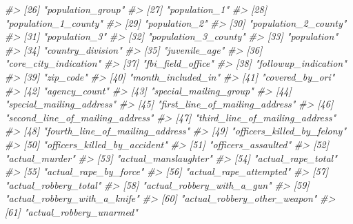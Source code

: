 \documentclass[
]{krantz}
\makeatletter
\newenvironment{Shaded}{\begin{snugshade}}{\end{snugshade}}
\newcommand{\CommentTok}[1]{\textcolor[rgb]{0.37,0.37,0.37}{\textit{#1}}}
\newenvironment{kframe}{%
\medskip{}
\setlength{\fboxsep}{.8em}
 \def\at@end@of@kframe{}%
 \ifinner\ifhmode%
  \def\at@end@of@kframe{\end{minipage}}%
  \begin{minipage}{\columnwidth}%
 \fi\fi%
 \def\FrameCommand##1{\hskip\@totalleftmargin \hskip-\fboxsep
 \colorbox{shadecolor}{##1}\hskip-\fboxsep
     \hskip-\linewidth \hskip-\@totalleftmargin \hskip\columnwidth}%
 \MakeFramed {\advance\hsize-\width
   \@totalleftmargin\z@ \linewidth\hsize
   \@setminipage}}%
 {\par\unskip\endMakeFramed%
 \at@end@of@kframe}
\renewenvironment{Shaded}{\begin{kframe}}{\end{kframe}}
\makeatother
\begin{document}
\begin{Shaded}
\begin{Highlighting}[]
\CommentTok{\#\textgreater{}  [26] "population\_group"                }
\CommentTok{\#\textgreater{}  [27] "population\_1"                    }
\CommentTok{\#\textgreater{}  [28] "population\_1\_county"             }
\CommentTok{\#\textgreater{}  [29] "population\_2"                    }
\CommentTok{\#\textgreater{}  [30] "population\_2\_county"             }
\CommentTok{\#\textgreater{}  [31] "population\_3"                    }
\CommentTok{\#\textgreater{}  [32] "population\_3\_county"             }
\CommentTok{\#\textgreater{}  [33] "population"                      }
\CommentTok{\#\textgreater{}  [34] "country\_division"                }
\CommentTok{\#\textgreater{}  [35] "juvenile\_age"                    }
\CommentTok{\#\textgreater{}  [36] "core\_city\_indication"            }
\CommentTok{\#\textgreater{}  [37] "fbi\_field\_office"                }
\CommentTok{\#\textgreater{}  [38] "followup\_indication"             }
\CommentTok{\#\textgreater{}  [39] "zip\_code"                        }
\CommentTok{\#\textgreater{}  [40] "month\_included\_in"               }
\CommentTok{\#\textgreater{}  [41] "covered\_by\_ori"                  }
\CommentTok{\#\textgreater{}  [42] "agency\_count"                    }
\CommentTok{\#\textgreater{}  [43] "special\_mailing\_group"           }
\CommentTok{\#\textgreater{}  [44] "special\_mailing\_address"         }
\CommentTok{\#\textgreater{}  [45] "first\_line\_of\_mailing\_address"   }
\CommentTok{\#\textgreater{}  [46] "second\_line\_of\_mailing\_address"  }
\CommentTok{\#\textgreater{}  [47] "third\_line\_of\_mailing\_address"   }
\CommentTok{\#\textgreater{}  [48] "fourth\_line\_of\_mailing\_address"  }
\CommentTok{\#\textgreater{}  [49] "officers\_killed\_by\_felony"       }
\CommentTok{\#\textgreater{}  [50] "officers\_killed\_by\_accident"     }
\CommentTok{\#\textgreater{}  [51] "officers\_assaulted"              }
\CommentTok{\#\textgreater{}  [52] "actual\_murder"                   }
\CommentTok{\#\textgreater{}  [53] "actual\_manslaughter"             }
\CommentTok{\#\textgreater{}  [54] "actual\_rape\_total"               }
\CommentTok{\#\textgreater{}  [55] "actual\_rape\_by\_force"            }
\CommentTok{\#\textgreater{}  [56] "actual\_rape\_attempted"           }
\CommentTok{\#\textgreater{}  [57] "actual\_robbery\_total"            }
\CommentTok{\#\textgreater{}  [58] "actual\_robbery\_with\_a\_gun"       }
\CommentTok{\#\textgreater{}  [59] "actual\_robbery\_with\_a\_knife"     }
\CommentTok{\#\textgreater{}  [60] "actual\_robbery\_other\_weapon"     }
\CommentTok{\#\textgreater{}  [61] "actual\_robbery\_unarmed"          }

\end{Highlighting}
\end{Shaded}
\end{document}
